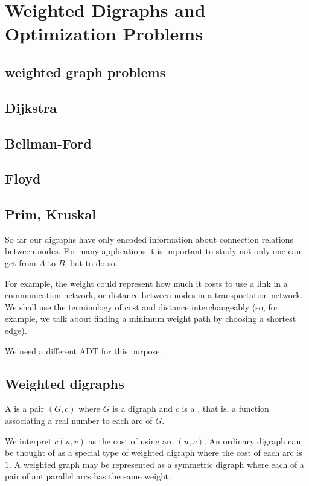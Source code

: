 \chapter{Weighted Digraphs and Optimization Problems}
\label{ch:weighted}


\section{ weighted graph problems}
\section{ Dijkstra}
\section{ Bellman-Ford}
\section{ Floyd}
\section{ Prim, Kruskal}


So far our digraphs have only encoded information about connection
relations between nodes. For many applications it is important to study
not only  one can get from $A$ to $B$, but
 to do so.

For example, the weight could represent how much it costs to use a link
in a communication network, or distance between nodes in a
transportation network. We shall use the terminology of cost and distance
interchangeably (so, for example, we talk about finding a minimum weight
path by choosing a shortest edge).

We need a different ADT for this purpose. 

\section{Weighted digraphs}
\label{sec:weighted}

\begin{Definition}
A  is a pair $(G, c)$ where $G$ is a digraph
and $c$ is a , that is, a function associating a
real number to each arc of $G$.

\end{Definition}

We interpret $c(u, v)$ as the cost of using arc $(u, v)$. An ordinary digraph 
can be thought of as a special type of weighted digraph where the cost of each 
arc is $1$. A weighted graph may be represented as a symmetric digraph where 
each of a pair of antiparallel arcs has the same weight.

